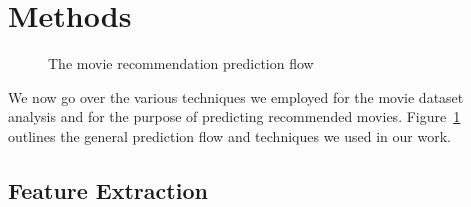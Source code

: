 \section{Methods}
\label{sec:methods}

\begin{figure}
\center
{}
\caption{The movie recommendation prediction flow}
\label{fig:methods_pipeline}  
\end{figure}


We now go over the various techniques we employed for the movie dataset analysis and for the purpose of predicting recommended movies.
Figure~\ref{fig:methods_pipeline} outlines the general prediction flow and techniques we used in our work.


\subsection{Feature Extraction}


